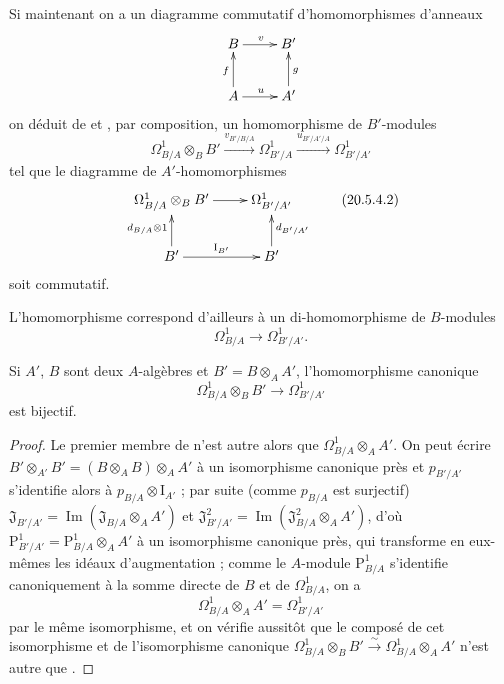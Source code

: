 \begin{env}[20.5.4]
\label{0.20.5.4-fr}
Si maintenant on a un diagramme commutatif d'homomorphismes d'anneaux
\[
\xymatrix{
  B \ar[r]^v & B' \\
  A \ar[u]^f \ar[r]^u & A' \ar[u]_g
}
\]
on déduit de  et , par composition,
un homomorphisme de $B'$-modules
\begin{equation}
\tag{20.5.4.1}
\label{0.20.5.4.1-fr}
  \Omega^1_{B/A}\otimes_B B'
  \xrightarrow{v_{B'/B/A}}\Omega^1_{B'/A}
  \xrightarrow{u_{B'/A'/A}}\Omega^1_{B'/A'}
\end{equation}
tel que le diagramme de $A'$-homomorphismes
\[
\xymatrix{
  \Omega^1_{B/A}\otimes_B B' \ar[r] & \Omega^1_{B'/A'} \\
  B' \ar[u]^{d_{B/A}\otimes1} \ar[r]^{\mathrm{I}_{B'}} &
  B' \ar[u]_{d_{B'/A'}}
}
\tag{20.5.4.2}
\label{0.20.5.4.2-fr}
\]
soit commutatif.

L'homomorphisme  correspond d'ailleurs à un
di-homomorphisme de $B$-modules
\begin{equation}
\tag{20.5.4.3}
\label{0.20.5.4.3-fr}
  \Omega^1_{B/A}\to\Omega^1_{B'/A'}.
\end{equation}
\end{env}

\begin{proposition}[20.5.5]
\label{0.20.5.5-fr}
Si $A'$, $B$ sont deux $A$-algèbres et $B'=B\otimes_A A'$,
l'homomorphisme canonique 
\begin{equation}
\tag{20.5.5.1}
\label{0.20.5.5.1-fr}
  \Omega^1_{B/A}\otimes_B B'\to\Omega^1_{B'/A'}
\end{equation}
est bijectif.
\end{proposition}

\begin{proof}
Le premier membre de  n'est autre alors que
$\Omega^1_{B/A}\otimes_A A'$. On peut écrire
$B'\otimes_{A'}B'=(B\otimes_A B)\otimes_A A'$ à un isomorphisme canonique
près et $p_{B'/A'}$ s'identifie alors à
$p_{B/A}\otimes\mathrm{I}_{A'}$ ; par suite (comme $p_{B/A}$ est surjectif)
$\mathfrak{J}_{B'/A'}=\operatorname{Im}(\mathfrak{J}_{B/A}\otimes_A A')$
et
$\mathfrak{J}^2_{B'/A'}
=\operatorname{Im}(\mathfrak{J}^2_{B/A}\otimes_A A')$, d'où
$\mathrm{P}^1_{B'/A'}=\mathrm{P}^1_{B/A}\otimes_A A'$ à un isomorphisme
canonique près, qui transforme en eux-mêmes les idéaux d'augmentation ;
comme le $A$-module $\mathrm{P}^1_{B/A}$ s'identifie canoniquement à la
somme directe de $B$ et de $\Omega^1_{B/A}$, on a
\begin{equation}
\tag{20.5.5.2}
\label{0.20.5.5.2-fr}
  \Omega^1_{B/A}\otimes_A A'=\Omega^1_{B'/A'}
\end{equation}
par le même isomorphisme, et on vérifie aussitôt que le composé de cet
isomorphisme et de l'isomorphisme canonique
$\Omega^1_{B/A}\otimes_B B'\xrightarrow{\sim}
\Omega^1_{B/A}\otimes_A A'$ n'est autre que .
\end{proof}

